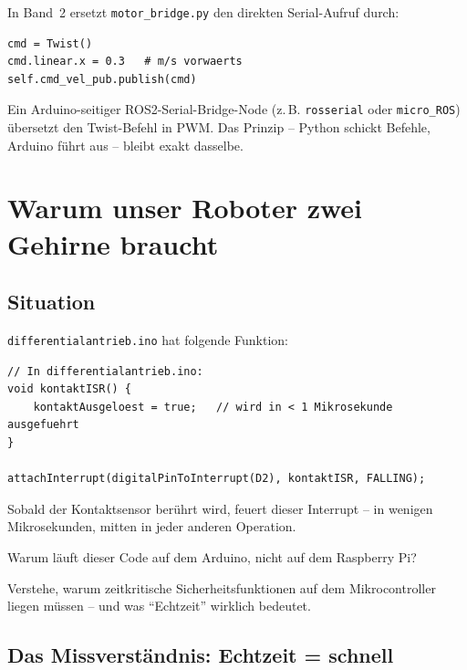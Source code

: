 \begin{robotikBox}
In Band~2 ersetzt \texttt{motor\_bridge.py} den direkten
Serial-Aufruf durch:
\begin{lstlisting}[style=python]
cmd = Twist()
cmd.linear.x = 0.3   # m/s vorwaerts
self.cmd_vel_pub.publish(cmd)
\end{lstlisting}
Ein Arduino-seitiger ROS2-Serial-Bridge-Node
(z.\,B. \texttt{rosserial} oder \texttt{micro\_ROS})
übersetzt den Twist-Befehl in PWM.
Das Prinzip -- Python schickt Befehle, Arduino führt aus --
bleibt exakt dasselbe.
\end{robotikBox}

\chapter{Warum unser Roboter zwei Gehirne braucht}

\kapitelstruktur

\section{Situation}

\texttt{differentialantrieb.ino} hat folgende Funktion:

\begin{lstlisting}[style=text]
// In differentialantrieb.ino:
void kontaktISR() {
    kontaktAusgeloest = true;   // wird in < 1 Mikrosekunde ausgefuehrt
}

attachInterrupt(digitalPinToInterrupt(D2), kontaktISR, FALLING);
\end{lstlisting}

Sobald der Kontaktsensor berührt wird, feuert dieser Interrupt --
in wenigen Mikrosekunden, mitten in jeder anderen Operation.

Warum läuft dieser Code auf dem Arduino, nicht auf dem Raspberry Pi?

\begin{aufgabeBox}
Verstehe, warum zeitkritische Sicherheitsfunktionen auf dem
Mikrocontroller liegen müssen -- und was \enquote{Echtzeit}
wirklich bedeutet.
\end{aufgabeBox}

\section{Das Missverständnis: Echtzeit = schnell}

